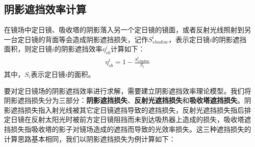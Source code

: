\documentclass[withoutpreface,bwprint]{cumcmthesis} %
\begin{document}
\subsection{阴影遮挡效率计算}

在镜场中定日镜、吸收塔的阴影落入另一个定日镜的镜面，或者反射光线照射到另一台定日镜的背面等会造成阴影遮挡损失，记作$S_{shadow}^i$，表示定日镜$i$的阴影遮挡面积，则定日镜$i$的阴影遮挡效率$\eta_{sb}^i$计算如下：
\begin{eqnarray}
\eta_{sb}^i=1-\frac{S_{shadow}^i}{S_i}
\end{eqnarray}
其中，$S_i$表示定日镜$i$的面积。

要对定日镜场的阴影遮挡效率进行求解，需要建立阴影遮挡效率理论模型。我们将阴影遮挡损失分为三部分：\textbf{阴影遮挡损失}、\textbf{反射光遮挡损失}和\textbf{吸收塔遮挡损失}。阴影遮挡损失指入射光线被其它定日镜遮挡导致的遮挡损失，反射光遮挡损失指后排定日镜在反射太阳光时被前方定日镜阻挡而未到达吸热器上造成的损失，吸收塔遮挡损失指吸收塔的影子对镜场造成的遮挡而导致的光效率损失。这三种遮挡损失的计算思路基本相同，我们以阴影遮挡损失为例计算如下：
\end{document}

